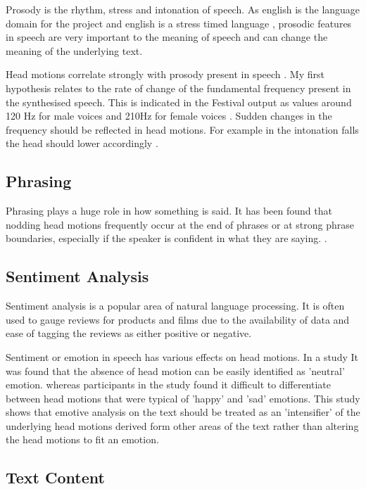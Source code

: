 \documentclass[bsc,frontabs,twoside,singlespacing,parskip]{infthesis}
\begin{document}
Prosody is the rhythm, stress and intonation of speech. As english is the language domain for the project and english is a stress timed language \cite{stress_timed}, prosodic features in speech are very important to the meaning of speech and can change the meaning of the underlying text.

Head motions correlate strongly with prosody present in speech \cite{vis_prosody}. My first hypothesis relates to the rate of change of the fundamental frequency present in the synthesised speech. This is indicated in the Festival output as values around 120 Hz for male voices and 210Hz for female voices \cite{f0_values}. Sudden changes in the frequency should be reflected in head motions. For example in the intonation falls the head should lower accordingly \cite{Kendon}.

\subsection{Phrasing}

Phrasing plays a huge role in how something is said. It has been found that nodding head motions frequently occur at the end of phrases or at strong phrase boundaries, especially if the speaker is confident in what they are saying. \cite{ishi2008}. 

\subsection{Sentiment Analysis}

Sentiment analysis is a popular area of natural language processing. It is often used to gauge reviews for products\cite{sentiment_online} and films\cite{sentiment_films} due to the availability of data and ease of tagging the reviews as either positive or negative.

Sentiment or emotion in speech has various effects on head motions. In a study It was found that the absence of head motion can be easily identified as 'neutral' emotion. \cite{emotion_head_motion} whereas participants in the study found it difficult to differentiate between head motions that were typical of 'happy' and 'sad' emotions. This study shows that emotive analysis on the text should be treated as an 'intensifier' of the underlying head motions derived form other areas of the text rather than altering the head motions to fit an emotion.

\subsection{Text Content}
\end{document}
